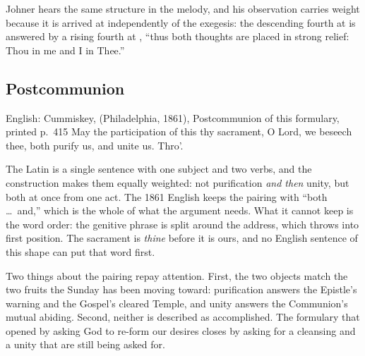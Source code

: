 Johner hears the same structure in the melody, and his observation carries
weight because it is arrived at independently of the exegesis: the
descending fourth at  is answered by a rising fourth at
, ``thus both thoughts are placed in strong relief: Thou in me
and I in Thee.''

\elementguard
\subsection*{Postcommunion }


\begin{namedtranslation}{English: Cummiskey,  (Philadelphia, 1861), Postcommunion of this formulary, printed p.~415}
May the participation of this thy sacrament, O Lord, we beseech thee, both
purify us, and unite us. Thro'.
\end{namedtranslation}

The Latin is a single sentence with one subject and two verbs, and the
 construction makes them equally weighted: not purification
\textit{and then} unity, but both at once from one act. The 1861 English keeps
the pairing with ``both \dots\ and,'' which is the whole of what the argument
needs. What it cannot keep is the word order: the genitive phrase  is split around the address, which throws  into
first position. The sacrament is \textit{thine} before it is ours, and no
English sentence of this shape can put that word first.

Two things about the pairing repay attention. First, the two objects match
the two fruits the Sunday has been moving toward: purification answers the
Epistle's warning and the Gospel's cleared Temple, and unity answers the
Communion's mutual abiding. Second, neither is described as accomplished. The
formulary that opened by asking God to re-form our desires closes by asking
for a cleansing and a unity that are still being asked for.
